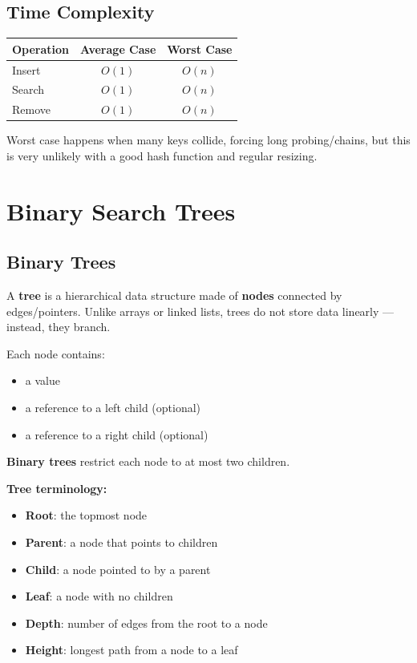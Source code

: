 \documentclass{article}
\begin{document}
\subsection{Time Complexity}

\begin{center}
\begin{tabular}{l c c}
\toprule
\textbf{Operation} & \textbf{Average Case} & \textbf{Worst Case} \\
\midrule
Insert & $O(1)$ & $O(n)$ \\
Search & $O(1)$ & $O(n)$ \\
Remove & $O(1)$ & $O(n)$ \\
\bottomrule
\end{tabular}
\end{center}

Worst case happens when many keys collide, forcing long probing/chains, but this is very unlikely with a good hash function and regular resizing.

\section{Binary Search Trees}

\subsection{Binary Trees}

A \textbf{tree} is a hierarchical data structure made of \textbf{nodes} connected by edges/pointers.  
Unlike arrays or linked lists, trees do not store data linearly — instead, they branch.

Each node contains:
\begin{itemize}
  \item a value
  \item a reference to a left child (optional)
  \item a reference to a right child (optional)
\end{itemize}

\textbf{Binary trees} restrict each node to at most two children.

\textbf{Tree terminology:}
\begin{itemize}
  \item \textbf{Root}: the topmost node
  \item \textbf{Parent}: a node that points to children
  \item \textbf{Child}: a node pointed to by a parent
  \item \textbf{Leaf}: a node with no children
  \item \textbf{Depth}: number of edges from the root to a node
  \item \textbf{Height}: longest path from a node to a leaf
\end{itemize}
\end{document}
